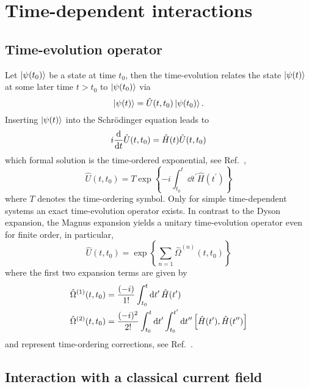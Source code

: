 \section{Time-dependent interactions}

\subsection{Time-evolution operator}

Let $\ket{\psi(t_0)}$ be a state at time $t_0$, then the time-evolution relates the state $\ket{\psi(t)}$ at some later time $t>t_0$ to $\ket{\psi(t_0)}$ via
\begin{equation}
	\ket{\psi(t)}
	=
	\hat{U}(t,t_0)
	\ket{\psi(t_0)}
	.
\end{equation}
Inserting $\ket{\psi(t)}$ into the Schrödinger equation leads to
\begin{equation}
	i\dv{t}
	\hat{U}(t,t_0)
	=
	\hat{H}(t)
	\hat{U}(t,t_0)
\end{equation}
which formal solution is the time-ordered exponential, see Ref.~\cite[p.~380]{Bartelmann2018},
\begin{equation}
	\hat{U}(t,t_0)
	=
	T\exp\left\{
		-i
		\int_{t_0}^t\dd{t^\prime}
		\hat{H}(t^\prime)
	\right\}
\end{equation}
where $T$ denotes the time-ordering symbol.
Only for simple time-dependent systems an exact time-evolution operator exists.
In contrast to the Dyson expansion, the Magnus expansion yields a unitary time-evolution operator even for finite order, in particular,
\begin{equation}
	\hat{U}(t,t_0)
	=
	\exp\left\{
		\sum_{n=1}
		\hat{\Omega}^{(n)}(t,t_0)
	\right\}
\end{equation}
where the first two expansion terms are given by
\begin{align}
	\hat{\Omega}^{(1)}(t,t_0)
	&=
	\frac{(-i)}{1!}
	\int_{t_0}^t\dd{t^\prime}
	\hat{H}(t^\prime)
	\\
	\hat{\Omega}^{(2)}(t,t_0)
	&=
	\frac{(-i)^2}{2!}
	\int_{t_0}^t\dd{t^\prime}
	\int_{t_0}^{t^\prime}\dd{t^{\prime\prime}}
	\comm{\hat{H}(t^\prime)}{\hat{H}(t^{\prime\prime})}
\end{align}
and represent time-ordering corrections, see Ref.~\cite{QuesadaMejia2015}.

\subsection{Interaction with a classical current field}

